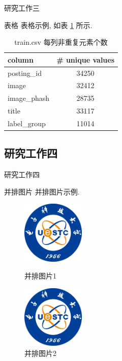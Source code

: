 \documentclass{beamer}
\begin{document}
\begin{frame}{研究工作三}
  \begin{block}{表格}
    表格示例, 如表 \ref{tab:unique_values} 所示. 

    \begin{table}[htbp]
      \small
      \centering
      \caption{train.csv 每列非重复元素个数}
      \label{tab:unique_values}
      \begin{tabular}{lc}
        \toprule
        column & \# unique values \\
        \midrule
        posting\_id & 34250 \\
        image & 32412 \\
        image\_phash & 28735 \\
        title & 33117 \\
        label\_group & 11014 \\
        \bottomrule
      \end{tabular}
    \end{table}
  \end{block}
\end{frame}

\subsection{研究工作四}

\begin{frame}{研究工作四}
  \begin{block}{并排图片}
    并排图片示例.
  \end{block}
  \begin{figure}[htbp]
    \centering
    \begin{minipage}[t]{0.48\textwidth}
      \centering
      \includegraphics[width=3cm]{uestclogo}
      \caption{并排图片1}
      \label{fig:left_side}
    \end{minipage}
    \begin{minipage}[t]{0.48\textwidth}
      \centering
      \includegraphics[width=3cm]{uestclogo}
      \caption{并排图片2}
      \label{fig:right_side}
    \end{minipage}
  \end{figure}
\end{frame}
\end{document}
